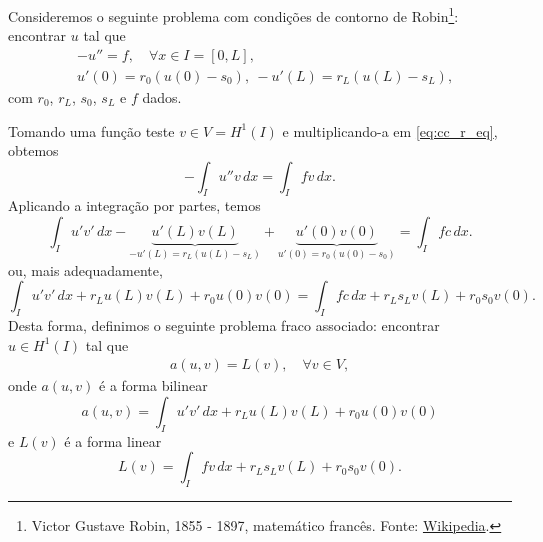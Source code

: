Consideremos o seguinte problema com condições de contorno de Robin\footnote{Victor Gustave Robin, 1855 - 1897, matemático francês. Fonte: \href{https://en.wikipedia.org/wiki/Victor_Robin}{Wikipedia}.}: encontrar $u$ tal que
\begin{align}
  &-u'' = f,\quad \forall x\in I=[0, L],\label{eq:cc_r_eq}\\
  &u'(0) = r_0(u(0)-s_0),~ -u'(L) = r_L(u(L)-s_L),\label{eq:cc_r_bc}
\end{align}
com $r_0$, $r_L$, $s_0$, $s_L$ e $f$ dados.

Tomando uma função teste $v\in V= H^1(I)$ e multiplicando-a em \eqref{eq:cc_r_eq}, obtemos
\begin{equation}
  - \int_I u''v\,dx = \int_I fv\,dx.
\end{equation}
Aplicando a integração por partes, temos
\begin{equation}
  \int_I u'v'\,dx - \underbrace{u'(L)v(L)}_{-u'(L)=r_L(u(L)-s_L)} + \underbrace{u'(0)v(0)}_{u'(0)=r_0(u(0)-s_0)} = \int_I fc\,dx.
\end{equation}
ou, mais adequadamente,
\begin{equation}
  \int_I u'v'\,dx + r_Lu(L)v(L) +r_0u(0)v(0) = \int_I fc\,dx + r_Ls_Lv(L) + r_0s_0v(0).
\end{equation}
Desta forma, definimos o seguinte problema fraco associado: encontrar $u\in H^1(I)$ tal que
\begin{align}
  a(u,v) = L(v),\quad\forall v\in V,
\end{align}
onde $a(u,v)$ é a forma bilinear
\begin{equation}
  a(u,v) = \int_I u'v'\,dx + r_Lu(L)v(L) + r_0u(0)v(0)
\end{equation}
e $L(v)$ é a forma linear
\begin{equation}
  L(v) = \int_I fv\,dx + r_Ls_Lv(L) + r_0s_0v(0).
\end{equation}

